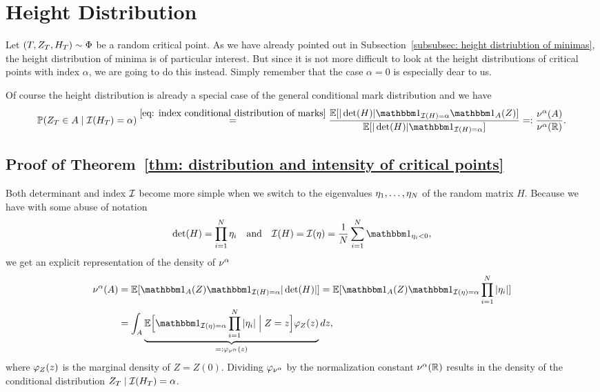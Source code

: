 \section{Height Distribution}
\label{sec: height distribution}

Let \((T,Z_T,H_T)\sim\Phi\) be a random critical point. As we have
already pointed out in Subsection~\ref{subsubsec: height distriubtion of minimas},
the height distribution of minima is of particular interest. But since it is
not more difficult to look at the height distributions of critical points with
index \(\alpha\), we are going to do this instead. Simply remember that the
case \(\alpha=0\) is especially dear to us.

Of course the height distribution is already a special case of the general
conditional mark distribution and we have
\[
	\Pr(\rf_T \in A \mid \negEV(H_T) = \alpha)
	\overset{\eqref{eq: index conditional distribution of marks}}=
	\frac{
		\E[|\det(H)|\ind_{\negEV(H)=\alpha}\ind_A(Z)]
	}{
		\E[|\det(H)|\ind_{\negEV(H)=\alpha}]
	}=:\frac{\markIntMeas^\alpha(A)}{\markIntMeas^\alpha(\real)}.
\]
\begin{theorem}
	\label{thm: distribution and intensity of critical points}
	
\end{theorem}

\subsection{Proof of Theorem~\ref{thm: distribution and intensity of critical points}}

Both determinant and index \(\mathcal{I}\) become more simple when we
switch to the eigenvalues \(\eta_1,\dots,\eta_N\) of the random matrix
\(H\). Because we have
with some abuse of notation
\[
	\det(H) = \prod_{i=1}^\dims \evH_i
	\quad\text{and}\quad
	\negEV(H) = \negEV(\evH)
	= \frac1\dims \sum_{i=1}^\dims \ind_{\evH_i < 0},
\]
we get an explicit representation of the density of \(\nu^\alpha\)
\[\begin{aligned}
	\markIntMeas^\alpha(A)
	&= \E[\ind_{A}(Z)\ind_{\negEV(H) = \alpha}|\det(H)|]
	= \E[\ind_{A}(Z)
	\ind_{\negEV(\evH)=\alpha}\prod_{i=1}^\dims |\evH_i|]\\
	&= \int_A \underbrace{
		\E\Big[
			\ind_{\negEV(\evH) = \alpha}\prod_{i=1}^\dims |\evH_i|
			\Bigm| Z=z
		\Big]
		\density_Z(z)
	}_{=:\density_{\markIntMeas^\alpha}(z)}
	dz,
\end{aligned}\]
where \(\varphi_Z(z)\) is the marginal density of \(Z=Z(0)\). Dividing
\(\varphi_{\nu^\alpha}\) by the normalization constant
\(\nu^\alpha(\mathbb{R})\) results in the density of the conditional
distribution \(Z_T \mid \mathcal{I}(H_T) = \alpha\).

